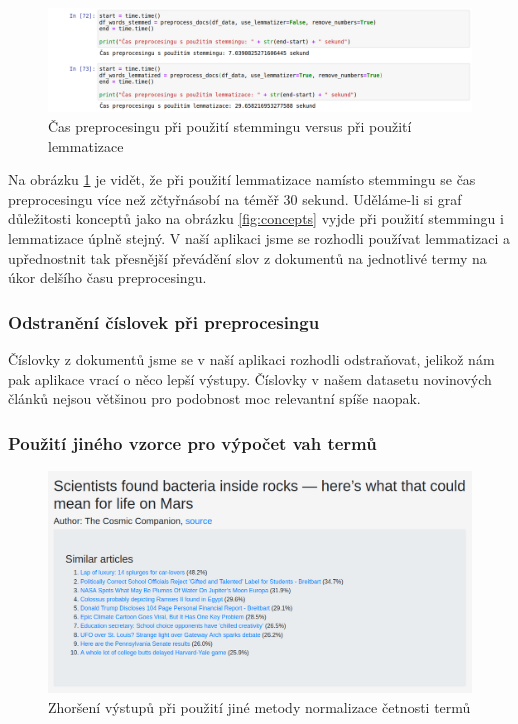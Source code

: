\documentclass[11pt]{scrartcl} %
\begin{document}
\begin{figure}[h] %
	\centering
	\includegraphics[width=1\columnwidth]{images/preprocesing_time.png}
	\caption{Čas preprocesingu při použití stemmingu versus při použití lemmatizace}
	\label{fig:preprocesing_time}
\end{figure}

Na obrázku \ref{fig:preprocesing_time} je vidět, že při použití lemmatizace namísto stemmingu se čas preprocesingu více než zčtyřnásobí na téměř 30 sekund. Uděláme-li si graf důležitosti konceptů jako na obrázku \ref{fig:concepts} vyjde při použití stemmingu i lemmatizace úplně stejný. V naší aplikaci jsme se rozhodli používat lemmatizaci a upřednostnit tak přesnější převádění slov z dokumentů na jednotlivé termy na úkor delšího času preprocesingu.

\subsubsection{Odstranění číslovek při preprocesingu}

Číslovky z dokumentů jsme se v naší aplikaci rozhodli odstraňovat, jelikož nám pak aplikace vrací o něco lepší výstupy. Číslovky v našem datasetu novinových článků nejsou většinou pro podobnost moc relevantní spíše naopak.

\subsubsection{Použití jiného vzorce pro výpočet vah termů}

\begin{figure}[h] %
	\centering
	\includegraphics[width=1\columnwidth]{images/output_bad.png}
	\caption{Zhoršení výstupů při použití jiné metody normalizace četnosti termů}
	\label{fig:output_bad}
\end{figure}
\end{document}
